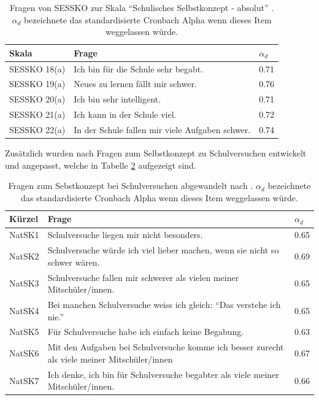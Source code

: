 \begin{table}[htbp]
  \centering
\begin{tabular}{@{}p{3cm}p{9cm}p{1cm}@{}}
\toprule Skala & Frage & $\alpha_d$  \\ 
\midrule SESSKO 18(a) & Ich bin für die Schule sehr begabt. &  0.71  \\ 
 SESSKO 19(a) & Neues zu lernen fällt mir schwer.  &  0.76 \\ 
 SESSKO 20(a) & Ich bin sehr intelligent. &  0.71  \\ 
 SESSKO 21(a) & Ich kann in der Schule viel. &  0.72   \\ 
 SESSKO 22(a) & In der Schule fallen mir viele Aufgaben schwer.  & 0.74   \\ 
\bottomrule 
\end{tabular} 
  \caption{Fragen von SESSKO zur Skala "`Schulisches Selbstkonzept - absolut"'  \citep{Schone2002}. $\alpha_d$ bezeichnete das standardisierte Cronbach Alpha wenn dieses Item weggelassen würde.}
  \label{tab:SESSKO}
\end{table}

Zusätzlich wurden nach \citet{Dierks2014} Fragen zum Selbstkonzept zu Schulversuchen entwickelt und angepasst, welche in Tabelle \ref{tab:NatSK} aufgezeigt sind.

\begin{table}[htbp]
  \centering
\begin{tabular}{@{}p{2cm}p{10cm}p{1cm}@{}}
\toprule Kürzel & Frage & $\alpha_d$  \\ 
\midrule NatSK1 & Schulversuche liegen mir nicht besonders. &  0.65  \\ 
 NatSK2 & Schulversuche würde ich viel lieber machen, wenn sie nicht so schwer wären.  &  0.69 \\ 
 NatSK3 & Schulversuche fallen mir schwerer als vielen meiner Mitschüler/innen. &  0.65  \\ 
 NatSK4 & Bei manchen Schulversuche weiss ich gleich: "`Das verstehe ich nie."' &  0.65   \\ 
 NatSK5 & Für Schulversuche habe ich einfach keine Begabung.   & 0.63   \\ 
 NatSK6 & Mit den Aufgaben bei Schulversuche komme ich besser zurecht als viele meiner Mitschüler/innen  & 0.67   \\ 
 NatSK7 & Ich denke, ich bin für Schulversuche begabter als viele meiner Mitschüler/innen.  & 0.66   \\ 
\bottomrule 
\end{tabular} 
  \caption{Fragen zum Sebstkonzept bei Schulversuchen abgewandelt nach \citet{Dierks2014}. $\alpha_d$ bezeichnete das standardisierte Cronbach Alpha wenn dieses Item weggelassen würde.}
  \label{tab:NatSK}
\end{table}

